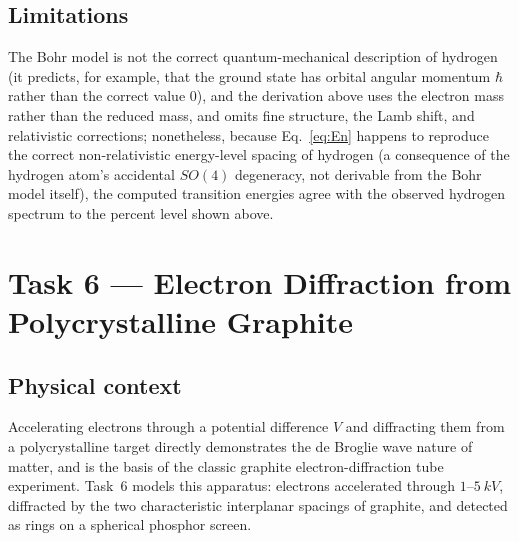 \documentclass[11pt]{article}
\begin{document}
\subsection{Limitations}
The Bohr model is not the correct quantum-mechanical description of hydrogen (it predicts, for example, that the ground state has orbital angular momentum $\hbar$ rather than the correct value $0$), and the derivation above uses the electron mass rather than the reduced mass, and omits fine structure, the Lamb shift, and relativistic corrections; nonetheless, because Eq.~\eqref{eq:En} happens to reproduce the correct non-relativistic energy-level spacing of hydrogen (a consequence of the hydrogen atom's accidental $SO(4)$ degeneracy, not derivable from the Bohr model itself), the computed transition energies agree with the observed hydrogen spectrum to the percent level shown above.

\section{Task 6 --- Electron Diffraction from Polycrystalline Graphite}
\label{sec:task6}

\subsection{Physical context}
Accelerating electrons through a potential difference $V$ and diffracting them from a polycrystalline target directly demonstrates the de Broglie wave nature of matter, and is the basis of the classic graphite electron-diffraction tube experiment. Task~6 models this apparatus: electrons accelerated through $1$--$\SI{5}{kV}$, diffracted by the two characteristic interplanar spacings of graphite, and detected as rings on a spherical phosphor screen.
\end{document}
